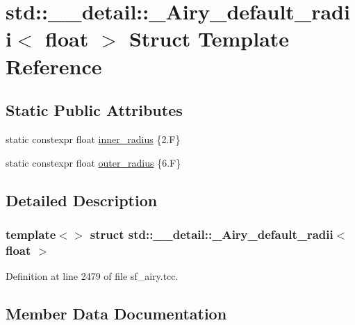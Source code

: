\hypertarget{structstd_1_1____detail_1_1__Airy__default__radii_3_01float_01_4}{}\section{std\+:\+:\+\_\+\+\_\+detail\+:\+:\+\_\+\+Airy\+\_\+default\+\_\+radii$<$ float $>$ Struct Template Reference}
\label{structstd_1_1____detail_1_1__Airy__default__radii_3_01float_01_4}
\subsection*{Static Public Attributes}
\begin{DoxyCompactItemize}
\item 
static constexpr float \hyperlink{structstd_1_1____detail_1_1__Airy__default__radii_3_01float_01_4_a798f4ff51a7e6a7dc5d0e5a670899c3a}{inner\+\_\+radius} \{2.\+F\}
\item 
static constexpr float \hyperlink{structstd_1_1____detail_1_1__Airy__default__radii_3_01float_01_4_ad8ea3a344f9748cf9bf32bcc17ca5d0b}{outer\+\_\+radius} \{6.\+F\}
\end{DoxyCompactItemize}


\subsection{Detailed Description}
\subsubsection*{template$<$$>$\newline
struct std\+::\+\_\+\+\_\+detail\+::\+\_\+\+Airy\+\_\+default\+\_\+radii$<$ float $>$}



Definition at line 2479 of file sf\+\_\+airy.\+tcc.



\subsection{Member Data Documentation}
\mbox{\label{structstd_1_1____detail_1_1__Airy__default__radii_3_01float_01_4_a798f4ff51a7e6a7dc5d0e5a670899c3a}} 
